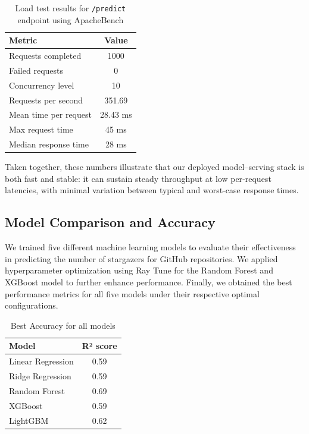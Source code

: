 \documentclass[12pt,a4paper]{article}
\begin{document}
\begin{table}[H]
\centering
\begin{tabular}{|l|c|}
\hline
\textbf{Metric} & \textbf{Value} \\
\hline
Requests completed         & 1000 \\
Failed requests            & 0 \\
Concurrency level          & 10 \\
Requests per second        & 351.69 \\
Mean time per request      & 28.43 ms \\
Max request time           & 45 ms \\
Median response time       & 28 ms \\
\hline
\end{tabular}
\caption{Load test results for \texttt{/predict} endpoint using ApacheBench}
\label{tab:predict-benchmark}
\end{table}

Taken together, these numbers illustrate that our deployed model–serving stack is both fast and stable: it can sustain steady throughput at low per‐request latencies, with minimal variation between typical and worst‐case response times.


\subsection{Model Comparison and Accuracy}
We trained five different machine learning models to evaluate their effectiveness in predicting the number of stargazers for GitHub repositories. We applied hyperparameter optimization using Ray Tune for the Random Forest and XGBoost model to further enhance performance. Finally, we obtained the best performance metrics for all five models under their respective optimal configurations.

\begin{table}[H]
\centering
\begin{tabular}{|l|c|}
\hline
\textbf{Model} & \textbf{R² score} \\
\hline
Linear Regression          & 0.59 \\
Ridge Regression           & 0.59 \\
Random Forest              & 0.69 \\
XGBoost                    & 0.59 \\
LightGBM                   & 0.62 \\
\hline
\end{tabular}
\caption{Best Accuracy for all models}
\label{tab:model}
\end{table}
\end{document}
